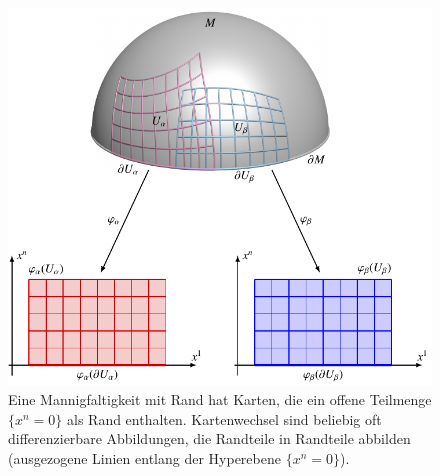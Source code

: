 %
%
%
\begin{figure}
\centering
\includegraphics{chapters/040-green/images/randkarten.pdf}
\caption{Eine Mannigfaltigkeit mit Rand hat Karten, die ein offene
Teilmenge $\{x^n=0\}$ als Rand enthalten.
Kartenwechsel sind beliebig oft differenzierbare Abbildungen, die
Randteile in Randteile abbilden (ausgezogene Linien entlang der
Hyperebene $\{x^n=0\}$).
\label{buch:green:green:fig:randkarten}}
\end{figure}
